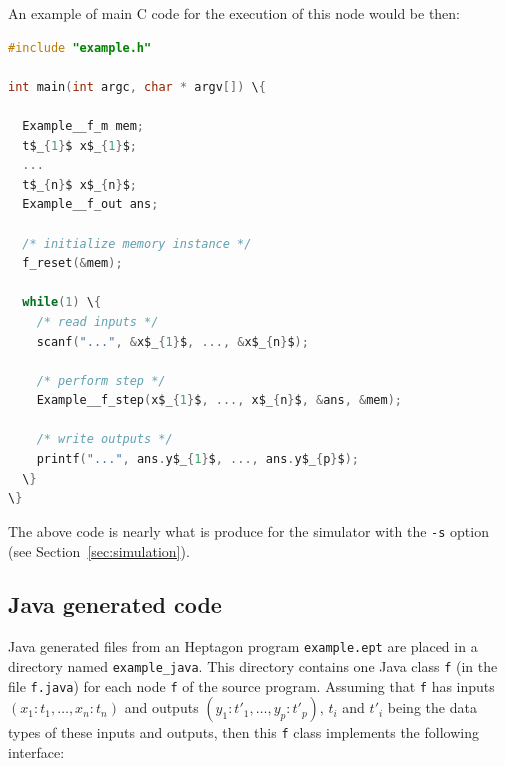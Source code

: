 \documentclass[a4paper]{article}
\begin{document}
An example of main C code for the execution of this node would be then:
\begin{lstlisting}[language=C]
#include "example.h"

int main(int argc, char * argv[]) \{
  
  Example__f_m mem;
  t$_{1}$ x$_{1}$;
  ...
  t$_{n}$ x$_{n}$;
  Example__f_out ans;

  /* initialize memory instance */
  f_reset(&mem);
  
  while(1) \{
    /* read inputs */
    scanf("...", &x$_{1}$, ..., &x$_{n}$);

    /* perform step */
    Example__f_step(x$_{1}$, ..., x$_{n}$, &ans, &mem);

    /* write outputs */
    printf("...", ans.y$_{1}$, ..., ans.y$_{p}$);
  \}
\}
\end{lstlisting}

The above code is nearly what is produce for the simulator with the \texttt{-s}
option (see Section~\ref{sec:simulation}).




\subsection{Java generated code}
\label{sec:java-generated-code}

Java generated files from an Heptagon program \texttt{example.ept} are placed in
a directory named \texttt{example\_java}. This directory contains one Java class
\texttt{f} (in the file \texttt{f.java}) for each node \texttt{f} of the source
program. Assuming that \texttt{f} has inputs $(x_1:t_1,\ldots,x_n:t_n)$ and
outputs $(y_1:t'_1,\ldots,y_p:t'_p)$, $t_i$ and $t'_i$ being the data types of
these inputs and outputs, then this \texttt{f} class implements the following
interface:
\end{document}
